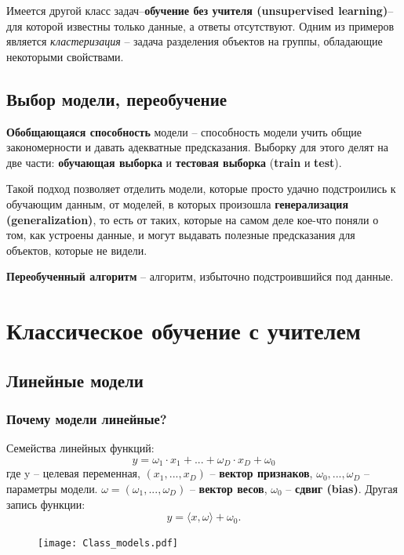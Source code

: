 \documentclass[a4paper, 10pt, openany]{book} %
\begin{document}
	Имеется другой класс задач--\textbf{обучение без учителя (unsupervised learning)}-- для которой известны только данные, а ответы отсутствуют. Одним из примеров является \textit{кластеризация} -- задача разделения объектов на группы, обладающие некоторыми свойствами.
	
	\section{Выбор модели, переобучение}
	
	\textbf{Обобщающаяся способность} модели -- способность модели учить общие закономерности и давать адекватные предсказания. Выборку для этого делят на две части: \textbf{обучающая выборка} и \textbf{тестовая выборка} (\textbf{train} и \textbf{test}). 
	
	Такой подход позволяет отделить модели, которые просто удачно подстроились к обучающим данным, от моделей, в которых произошла \textbf{генерализация (generalization)}, то есть от таких, которые на самом деле кое-что поняли о том, как устроены данные, и могут выдавать полезные предсказания для объектов, которые не видели.
	
	\textbf{Переобученный алгоритм} -- алгоритм, избыточно подстроившийся под данные.
	
	\chapter{Классическое обучение с учителем}
	
	\section{Линейные модели}
	
	\subsection{Почему модели линейные?}
	
	Семейства линейных функций:
	\begin{equation*}
		y = \omega_1 \cdot x_1 + ... + \omega_D \cdot x_D + \omega_0
	\end{equation*}
	где y -- целевая переменная, $(x_1, ..., x_D)$ -- \textbf{вектор признаков}, $\omega_0, ..., \omega_D$ -- параметры модели. $\omega = (\omega_1, ..., \omega_D)$ -- \textbf{вектор весов}, $\omega_0$ -- \textbf{сдвиг (bias)}. Другая запись функции:
	\begin{equation*}
		y = \langle x,\omega \rangle + \omega_0.
	\end{equation*}
	\begin{figure}[h!]
		\centering
		\texttt{[image: Class\_models.pdf]}
	\end{figure}
	
\end{document}
